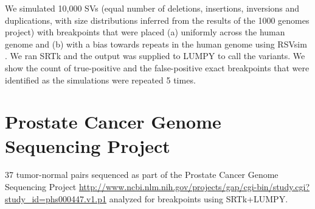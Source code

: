 \documentclass[a0,final]{a0poster}
\begin{document}
\begin{multicols}{3}
We simulated 10,000 SVs (equal number of deletions, insertions, inversions and
duplications, with size distributions inferred from the results of the 1000
genomes project) with breakpoints that were placed (a) uniformly across the human
genome and (b) with a bias towards repeats
in the human  genome using RSVsim \cite{Bartenhagen01072013}.  We ran SRTk and the output was
supplied to LUMPY \cite{ryan} to call the variants. We show the count of
true-positive and the false-positive exact breakpoints that were identified as the simulations were repeated 5 times.

\section*{Prostate Cancer Genome Sequencing Project}

37 tumor-normal pairs sequenced as part of the Prostate Cancer
Genome Sequencing Project
\url{http://www.ncbi.nlm.nih.gov/projects/gap/cgi-bin/study.cgi?study_id=phs000447.v1.p1}
analyzed for breakpoints using SRTk+LUMPY.


\end{multicols}
\end{document}
